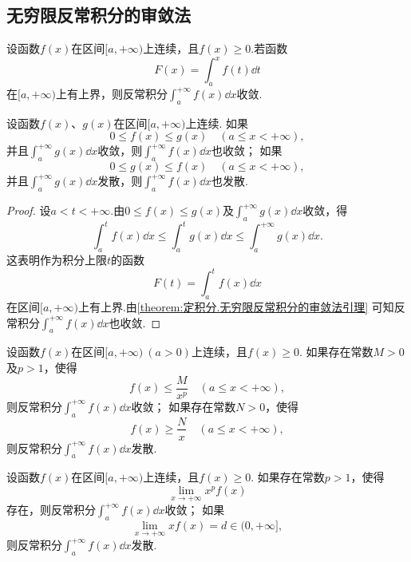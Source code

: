 \subsection{无穷限反常积分的审敛法}
\begin{theorem}\label{theorem:定积分.无穷限反常积分的审敛法引理}
设函数\(f(x)\)在区间\([a,+\infty)\)上连续，且\(f(x) \geqslant 0\).若函数\[
F(x)=\int_a^x f(t) \dd{t}
\]在\([a,+\infty)\)上有上界，则反常积分\(\int_a^{+\infty} f(x) \dd{x}\)收敛.
\end{theorem}

\begin{theorem}[比较审敛原理]\label{theorem:定积分.无穷限反常积分的比较审敛原理}
设函数\(f(x)\)、\(g(x)\)在区间\([a,+\infty)\)上连续.
如果\[
0 \leqslant f(x) \leqslant g(x) \quad (a \leqslant x < +\infty),
\]并且\(\int_a^{+\infty} g(x) \dd{x}\)收敛，则\(\int_a^{+\infty} f(x) \dd{x}\)也收敛；
如果\[
0 \leqslant g(x) \leqslant f(x) \quad (a \leqslant x < +\infty),
\]并且\(\int_a^{+\infty} g(x) \dd{x}\)发散，则\(\int_a^{+\infty} f(x) \dd{x}\)也发散.
\begin{proof}
设\(a < t < +\infty\).由\(0 \leqslant f(x) \leqslant g(x)\)及\(\int_a^{+\infty} g(x) \dd{x}\)收敛，得\[
\int_a^t f(x) \dd{x}
\leqslant
\int_a^t g(x) \dd{x}
\leqslant
\int_a^{+\infty} g(x) \dd{x}.
\]这表明作为积分上限\(t\)的函数\[
F(t) = \int_a^t f(x) \dd{x}
\]在区间\([a,+\infty)\)上有上界.由\cref{theorem:定积分.无穷限反常积分的审敛法引理} 可知反常积分\(\int_a^{+\infty} f(x) \dd{x}\)也收敛.
\end{proof}
\end{theorem}

\begin{theorem}[比较审敛法]\label{theorem:定积分.无穷限反常积分的比较审敛法}
设函数\(f(x)\)在区间\([a,+\infty)\ (a>0)\)上连续，且\(f(x) \geqslant 0\).
如果存在常数\(M>0\)及\(p>1\)，使得\[
f(x) \leqslant \frac{M}{x^p} \quad (a \leqslant x < +\infty),
\]则反常积分\(\int_a^{+\infty} f(x) \dd{x}\)收敛；
如果存在常数\(N>0\)，使得\[
f(x) \geqslant \frac{N}{x} \quad (a \leqslant x < +\infty),
\]则反常积分\(\int_a^{+\infty} f(x) \dd{x}\)发散.
\end{theorem}

\begin{theorem}[极限审敛法]\label{theorem:定积分.无穷限反常积分的极限审敛法}
设函数\(f(x)\)在区间\([a,+\infty)\)上连续，且\(f(x) \geqslant 0\).
如果存在常数\(p > 1\)，使得\[
\lim\limits_{x \to +\infty} x^p f(x)
\]存在，则反常积分\(\int_a^{+\infty} f(x) \dd{x}\)收敛；
如果\[
\lim\limits_{x \to +\infty} x f(x) = d \in (0,+\infty],
\]则反常积分\(\int_a^{+\infty} f(x) \dd{x}\)发散.
\end{theorem}

